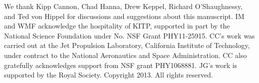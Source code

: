 \documentclass[aps,prd,reprint,nofootinbib]{revtex4-1}
\begin{document}
\begin{acknowledgments}
  We thank Kipp Cannon, Chad Hanna, Drew Keppel, Richard
  O'Shaughnessy, and Ted von Hippel for discussions and suggestions
  about this manuscript.  IM and WMF acknowledge the hospitality of KITP, supported in part by the National Science Foundation under No. NSF Grant PHY11-25915.  CC's work was carried out  at the Jet Propulsion Laboratory, California Institute of Technology, under contract to the National Aeronautics and Space Administration.  CC also gratefully acknowledges support from NSF grant PHY1068881.  JG's work is supported by the Royal Society.  Copyright 2013.  All rights reserved.
\end{acknowledgments}

 
\end{document}
